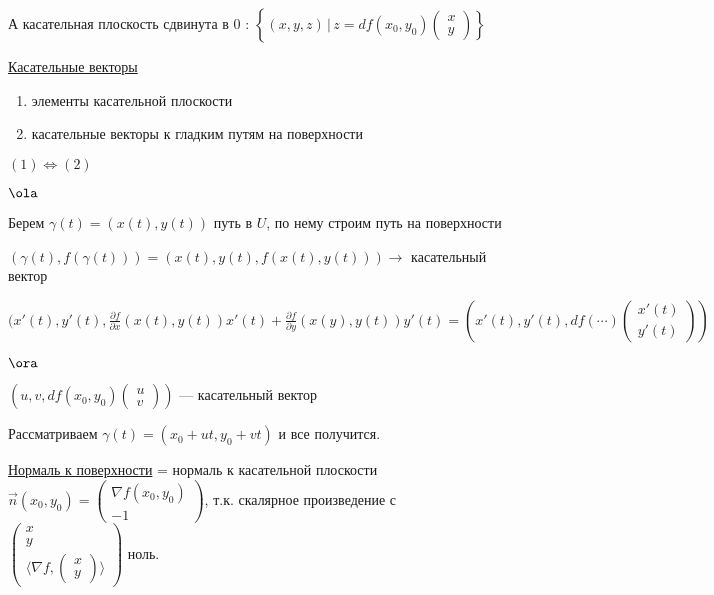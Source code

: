 А касательная плоскость сдвинута в 0 : $\left \{ (x, y, z) \, | \, z = df(x_0, y_0) \begin{pmatrix}
    x\\
    y
\end{pmatrix} \right \}$

\quad

\underline{ Касательные векторы } \\

\begin{definition}
   \begin{enumerate}
       \item элементы касательной плоскости
       \item касательные векторы к гладким путям на поверхности
    \end{enumerate}

    $(1) \Longleftrightarrow (2)$
\end{definition}

$\ola$ 

Берем $\gamma(t) = (x(t), y(t))$ путь в $U$, по нему строим путь на поверхности 

$(\gamma(t), f(\gamma(t))) = (x(t), y(t), f(x(t), y(t))) \rightarrow$ касательный вектор

$(x'(t), y'(t), \frac{\partial f}{\partial x}(x(t), y(t)) x'(t) + \frac{\partial f}{\partial y} (x(y), y(t)) y'(t) = (x'(t), y'(t), df(\cdots) \begin{pmatrix}
    x'(t)\\
    y'(t)
\end{pmatrix})$

$\ora$

$(u, v, df(x_0, y_0)\begin{pmatrix}
    u\\
    v
\end{pmatrix}) $ --- касательный вектор

Рассматриваем $\gamma(t) = (x_0 + ut, y_0 + vt)$ и все получится.

\quad

\underline{Нормаль к поверхности} = нормаль к касательной плоскости\\

$\vec{n} (x_0, y_0) = \begin{pmatrix}
    \nabla f(x_0, y_0)\\
    -1
\end{pmatrix}$, т.к. скалярное произведение с $\begin{pmatrix}
    x\\
    y\\
    \langle \nabla f , \begin{pmatrix}
        x\\
        y
    \end{pmatrix}\rangle
\end{pmatrix}$ ноль.

